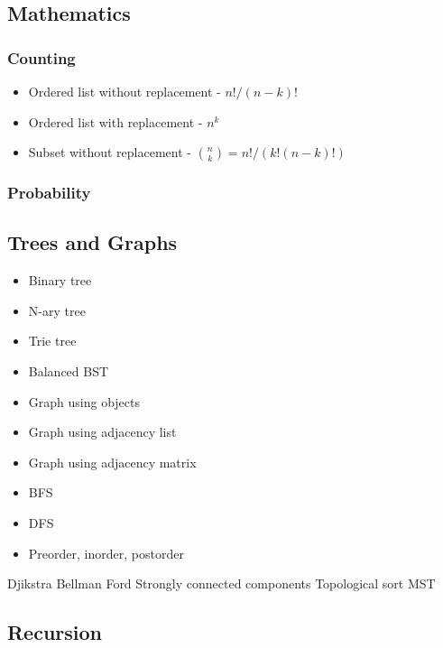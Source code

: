 \documentclass{article}
\begin{document}
\subsection{Mathematics}
\subsubsection{Counting}
\begin{itemize}
    \item Ordered list without replacement - $n!/(n-k)!$
    \item Ordered list with replacement - $n^k$
    \item Subset without replacement - $\binom{n}{k} = n!/(k!(n-k)!)$
\end{itemize}
\subsubsection{Probability}

\subsection{Trees and Graphs}
\begin{itemize}
    \item Binary tree
    \item N-ary tree
    \item Trie tree
    \item Balanced BST
    \item Graph using objects
    \item Graph using adjacency list
    \item Graph using adjacency matrix
    \item BFS
    \item DFS
    \item Preorder, inorder, postorder
\end{itemize}
Djikstra
Bellman Ford
Strongly connected components
Topological sort
MST

\subsection{Recursion}
\end{document}

